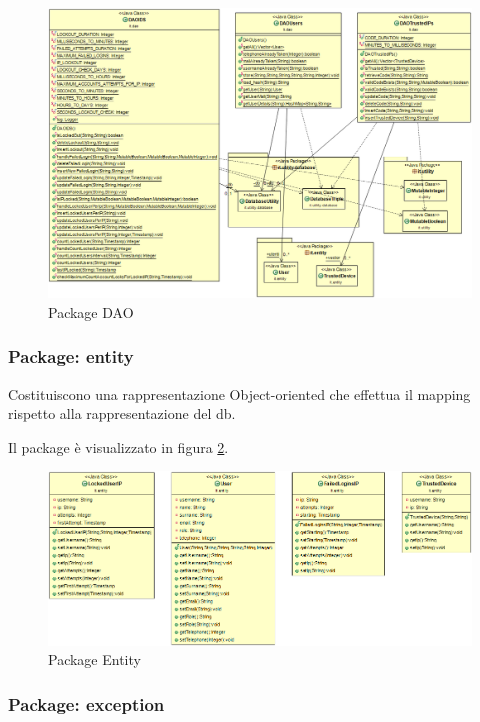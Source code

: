 \begin{figure}[!htbp]
	\centering
	\includegraphics[scale = .4]{img/dependencies_dao}
	\caption{Package DAO}
	\label{gfx:dependencies_dao}
\end{figure}

\subsubsection{Package: \textbf{entity}}

Costituiscono una rappresentazione Object-oriented che effettua il mapping rispetto alla rappresentazione del db.

Il package è visualizzato in figura \ref{gfx:dependencies_entity}.

\begin{figure}[!htbp]
	\centering
	\includegraphics[scale = .4]{img/dependencies_entity}
	\caption{Package Entity}
	\label{gfx:dependencies_entity}
\end{figure}

\subsubsection{Package: \textbf{exception}}

